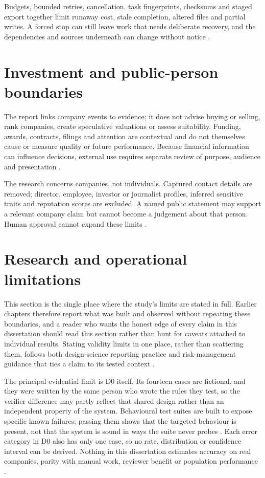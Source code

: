 Budgets, bounded retries, cancellation, task fingerprints, checksums and staged export together limit
runaway cost, stale completion, altered files and partial writes. A forced stop can still leave work
that needs deliberate recovery, and the dependencies and sources underneath can change without notice
\citep{pineau2021reproducibility,nist2023airmf}.
\section{Investment and public-person boundaries}

The report links company events to evidence; it does not advise buying or selling, rank companies,
create speculative valuations or assess suitability. Funding, awards, contracts, filings and attention
are contextual and do not themselves cause or measure quality or future performance. Because financial
information can influence decisions, external use requires separate review of purpose, audience and
presentation \citep{fca2024promotions,estrin2024digital}.

The research concerns companies, not individuals. Captured contact details are removed; director,
employee, investor or journalist profiles, inferred sensitive traits and reputation scores are
excluded. A named public statement may support a relevant company claim but cannot become a judgement
about that person. Human approval cannot expand these limits \citep{cddo2023genai,nist2023airmf}.
\section{Research and operational limitations}

This section is the single place where the study's limits are stated in full. Earlier chapters
therefore report what was built and observed without repeating these boundaries, and a reader who
wants the honest edge of every claim in this dissertation should read this section rather than hunt for
caveats attached to individual results. Stating validity limits in one place, rather than scattering
them, follows both design-science reporting practice and risk-management guidance that ties a claim to
its tested context \citep{hevner2004design,nist2023airmf}.

The principal evidential limit is D0 itself. Its fourteen cases are fictional, and they were written
by the same person who wrote the rules they test, so the verifier difference may partly reflect that
shared design rather than an independent property of the system. Behavioural test suites are built to
expose specific known failures; passing them shows that the targeted behaviour is present, not that
the system is sound in ways the suite never probes \citep{ribeiro2020checklist}. Each error category
in D0 also has only one case, so no rate, distribution or confidence interval can be derived. Nothing
in this dissertation estimates accuracy on real companies, parity with manual work, reviewer benefit
or population performance \citep{kapoor2023leakage,pineau2021reproducibility}.

